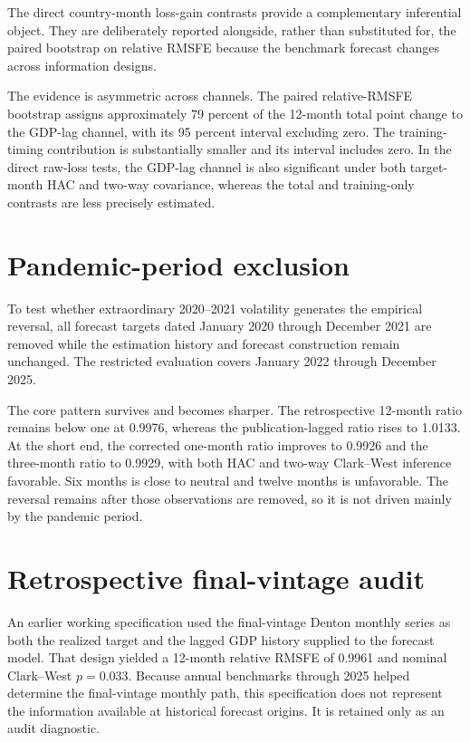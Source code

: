 \documentclass[12pt]{article}
\begin{document}


The direct country-month loss-gain contrasts provide a complementary inferential object. They are deliberately reported alongside, rather than substituted for, the paired bootstrap on relative RMSFE because the benchmark forecast changes across information designs.



The evidence is asymmetric across channels. The paired relative-RMSFE bootstrap assigns approximately 79 percent of the 12-month total point change to the GDP-lag channel, with its 95 percent interval excluding zero. The training-timing contribution is substantially smaller and its interval includes zero. In the direct raw-loss tests, the GDP-lag channel is also significant under both target-month HAC and two-way covariance, whereas the total and training-only contrasts are less precisely estimated.

\section{Pandemic-period exclusion}
To test whether extraordinary 2020--2021 volatility generates the empirical reversal, all forecast targets dated January 2020 through December 2021 are removed while the estimation history and forecast construction remain unchanged. The restricted evaluation covers January 2022 through December 2025.



The core pattern survives and becomes sharper. The retrospective 12-month ratio remains below one at 0.9976, whereas the publication-lagged ratio rises to 1.0133. At the short end, the corrected one-month ratio improves to 0.9926 and the three-month ratio to 0.9929, with both HAC and two-way Clark--West inference favorable. Six months is close to neutral and twelve months is unfavorable. The reversal remains after those observations are removed, so it is not driven mainly by the pandemic period.

\section{Retrospective final-vintage audit}
An earlier working specification used the final-vintage Denton monthly series as both the realized target and the lagged GDP history supplied to the forecast model. That design yielded a 12-month relative RMSFE of 0.9961 and nominal Clark--West $p=0.033$. Because annual benchmarks through 2025 helped determine the final-vintage monthly path, this specification does not represent the information available at historical forecast origins. It is retained only as an audit diagnostic.
\end{document}

